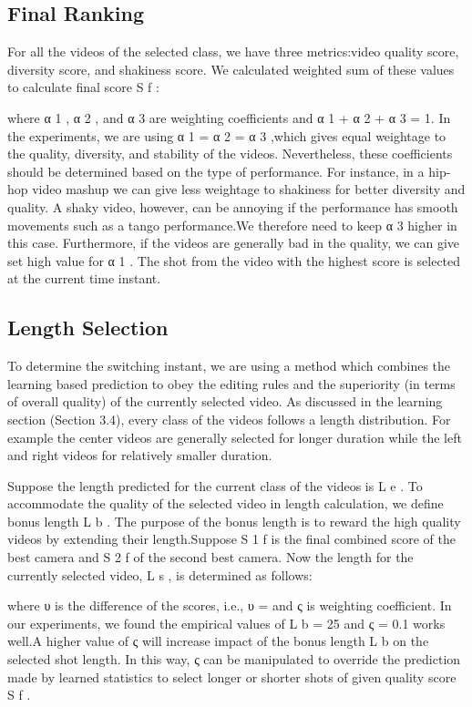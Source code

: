 \documentclass{sig-alternate}
\begin{document}
\subsection{Final Ranking}
For all the videos of the selected class, we have three metrics:video quality score, diversity score, and shakiness score. We calculated weighted sum of these values to calculate final score S f :

where α 1 , α 2 , and α 3 are weighting coefficients and α 1 + α 2 + α 3 = 1. In the experiments, we are using α 1 = α 2 = α 3 ,which gives equal weightage to the quality, diversity, and stability of the videos. Nevertheless, these coefficients should be determined based on the type of performance. For instance, in a hip-hop video mashup we can give less weightage to shakiness for better diversity and quality. A shaky video, however, can be annoying if the performance has smooth movements such as a tango performance.We therefore need to keep α 3 higher in this case. Furthermore, if the videos are generally bad in the quality, we can give set high value for α 1 . The shot from the video with the highest score is selected at the current time instant.

\subsection{Length Selection}
To determine the switching instant, we are using a method which combines the learning based prediction to obey the editing rules and the superiority (in terms of overall quality) of the currently selected video. As discussed in the learning section (Section 3.4), every class of the videos follows a length distribution. For example the
center videos are generally selected for longer duration while the left and right videos for relatively smaller duration.

Suppose the length predicted for the current class of the videos is L e . To accommodate the quality of the selected video in length calculation, we define bonus length L b . The purpose of the bonus length is to reward the high quality videos by extending their length.Suppose S 1 f is the final combined score of the best camera and S 2 f of the second best camera. Now the length for the currently selected video, L s , is determined as follows:

where υ is the difference of the scores, i.e., υ = and ς is weighting coefficient. In our experiments, we found the empirical values of L b = 25 and ς = 0.1 works well.A higher value of ς will increase impact of the bonus length L b on the selected shot length. In this way, ς can be manipulated to override the prediction made by learned statistics to select longer or shorter shots of given quality score S f .
\end{document}
